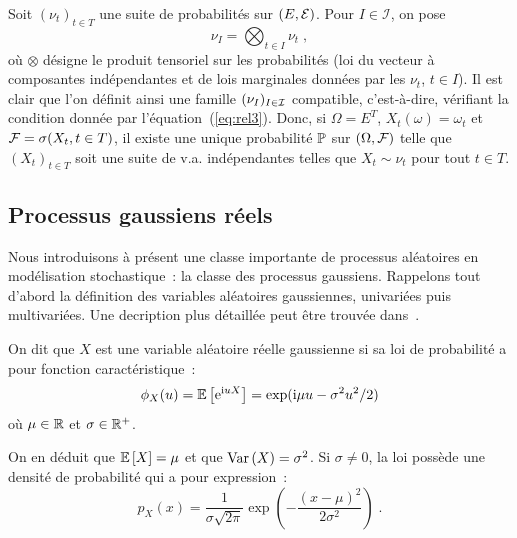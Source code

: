 \begin{example}
\label{exple:vaindep}
Soit $(\nu_t)_{t \in T}$ une suite
de probabilit\'es sur $(E,\mathcal{E})$. Pour $I\in\mathcal {I}$, on pose
\begin{equation}
\nu_I = \bigotimes_{t\in I} \nu_{t} \;,
\end{equation}
o\`u $\otimes$ d\'esigne le produit tensoriel sur les probabilit\'es (loi du
vecteur \`a composantes ind\'ependantes et de lois
marginales donn\'ees par les $\nu_t$, $t\in I$).
Il est clair que l'on d\'efinit ainsi une famille $(\nu_I)_{I \in
\mathcal{I}}$ compatible, c'est-\`a-dire, v\'erifiant la condition donn\'ee par
l'\'equation~(\ref{eq:rel3}). Donc, si $\Omega = E^{T}$,
$X_t(\omega)= \omega_t$ et $\mathcal{F} = \sigma(X_t, t \in T)$, il
existe une unique probabilit\'e $\mathbb{P}$ sur $(\Omega,\mathcal{F})$
telle que $(X_t)_{t \in T}$ soit une suite de v.a.
ind\'ependantes telles que $X_t\sim\nu_t$ pour tout $t\in T$.
\end{example}

\subsection{Processus gaussiens r\'eels}\label{sec:proc-gauss-reels}
Nous introduisons \`a pr\'esent une classe importante de processus al\'eatoires en
mod\'elisation stochastique~: la classe des processus gaussiens.
Rappelons tout d'abord la d\'efinition des variables al\'eatoires
gaussiennes, univari\'ees puis multivari\'ees. Une decription plus
d\'etaill\'ee peut \^{e}tre trouv\'ee dans~\cite[Chapter~16]{jacod:protter:2003}.


\begin{definition}
 On dit que $X$ est une variable al\'eatoire r\'eelle gaussienne si
 sa loi de probabilit\'e a pour fonction caract\'eristique~:
 $$
   \phi_X(u)={\mathbb E}\left[ \mathrm{e}^{\mathrm{i} uX} \right]=\exp(\mathrm{i} \mu u -\sigma^2 u^2/2)
 $$
 o\`u $\mu\in \mathbb{R}$ et $\sigma\in\mathbb{R}^+$.
\end{definition}
 On en d\'eduit que ${\mathbb E}\left[ X \right]=\mu$ et que $\mathrm{Var}\left( X \right)=\sigma^2$. Si
$\sigma\neq 0$, la loi poss\`ede une densit\'e de probabilit\'e qui
a pour expression~:
\begin{equation}
  \label{eq:densite-gaussienne-unidim}
 p_X(x)=\frac{1}{\sigma\sqrt{2\pi}}
  \exp\left (-\frac{(x-\mu)^2}{2\sigma^2} \right)\;.
\end{equation}


